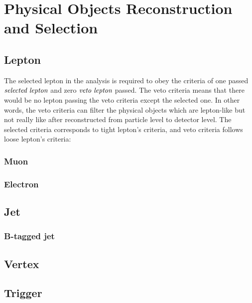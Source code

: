 

\section{Physical Objects Reconstruction and Selection}
\label{sec:PhysObj}

	\subsection{Lepton}
	\label{ssec:PhysObj_lep}

		The selected lepton in the analysis is required to obey the criteria of one passed $\emph{selected lepton}$ and zero $\emph{veto lepton}$ passed. The veto criteria means that there would be no lepton passing the veto criteria except the selected one. In other words, the veto criteria can filter the physical objects which are lepton-like but not really like after reconstructed from particle level to detector level. The selected criteria corresponds to tight lepton's criteria, and veto criteria follows loose lepton's criteria:

		\subsubsection{Muon}
		\label{sssec:Muon}
			

		\subsubsection{Electron}
		\label{sssec:Electron}

	\subsection{Jet}
	\label{ssec:PhysObj_jet}

		\subsubsection{B-tagged jet}
		\label{sssec:bjet}


	\subsection{Vertex}
	\label{ssec:PhysObj_vertex}

	\subsection{Trigger}
	\label{ssec:PhysObj_trg}


\FloatBarrier
